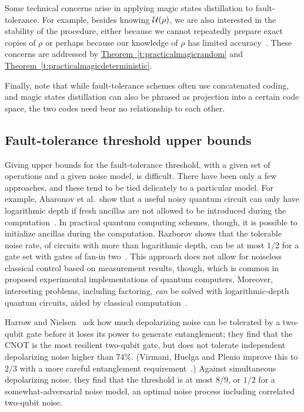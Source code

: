 \documentclass[11pt]{article}
\theoremstyle{note}
\newcommand{\thmref}[1]{\hyperref[#1]{{Theorem~\ref*{#1}}}}
\begin{document}
Some technical concerns arise in applying magic states distillation to fault-tolerance.  For example, besides knowing $\mathcal{U}(\rho)$, we are also interested in the stability of the procedure, either because we cannot repeatedly prepare exact copies of $\rho$ or perhaps because our knowledge of $\rho$ has limited accuracy~\cite{Reichardt05distancethree}.  These concerns are addressed by \thmref{t:practicalmagicrandom} and \thmref{t:practicalmagicdeterministic}.  

Finally, note that while fault-tolerance schemes often use concatenated coding, and magic states distillation can also be phrased as projection into a certain code space, the two codes need bear no relationship to each other.


\subsection{Fault-tolerance threshold upper bounds} \label{s:upperbounds}

Giving upper bounds for the fault-tolerance threshold, with a given set of operations and a given noise model, is difficult.  There have been only a few approaches, and these tend to be tied delicately to a particular model.  For example, Aharonov et al.~show that a useful noisy quantum circuit can only have logarithmic depth if fresh ancillas are not allowed to be introduced during the computation~\cite{AharonovBenOr96,AharonovBenorImpagliazzoNisan96}.  In practical quantum computing schemes, though, it is possible to initialize ancillas during the computation.  Razborov shows that the tolerable noise rate, of circuits with more than logarithmic depth, can be at most $1/2$ for a gate set with gates of fan-in two~\cite{Razborov}.  This approach does not allow for noiseless classical control based on measurement results, though, which is common in proposed experimental implementations of quantum computers.  Moreover, interesting problems, including factoring, \emph{can} be solved with logarithmic-depth quantum circuits, aided by classical computation~\cite{CleveWatrous00}.  

Harrow and Nielsen~\cite{HarrowNielsen} ask how much depolarizing noise can be tolerated by a two-qubit gate before it loses its power to generate entanglement; they find that the CNOT is the most resilient two-qubit gate, but does not tolerate independent depolarizing noise higher than 74\%. (Virmani, Huelga and Plenio improve this to $2/3$ with a more careful entanglement requirement~\cite{VirmaniHuelgaPlenio}.)  Against simultaneous depolarizing noise, they find that the threshold is at most $8/9$, or $1/2$ for a somewhat-adversarial noise model, an optimal noise process including correlated two-qubit noise.
\end{document}

